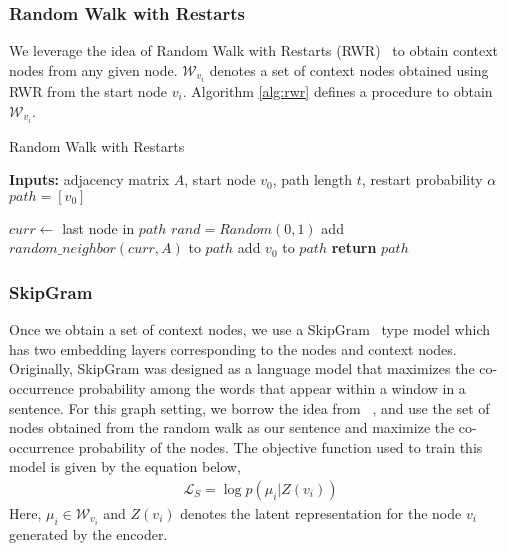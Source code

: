 \documentclass{article}
\begin{document}
\subsubsection{Random Walk with Restarts}
We leverage the idea of Random Walk with Restarts (RWR)~\cite{rwr} to obtain context nodes from any given node. $\mathcal{W}_{v_i}$ denotes a set of context nodes obtained using RWR from the start node $v_i$. Algorithm \ref{alg:rwr} defines a procedure to obtain $\mathcal{W}_{v_i}$. 

\begin{algorithm}
\caption{Random Walk with Restarts}
\label{alg:rwr}
\begin{algorithmic}
\State \textbf{Inputs: }{adjacency matrix $A$, start node $v_0$, path length $t$, restart probability $\alpha$}\\
\State $ path = [v_0] $ 

\State $curr \gets$ last node in $path$
\State $ rand = Random(0, 1) $ 
    \State add $random\_neighbor(curr, A)$ to $path$
  \Else
    \State add $v_0$ to $path$ 
\EndIf
\EndWhile
\State \textbf{return} $path$
\EndProcedure
\end{algorithmic}
\end{algorithm}


\subsubsection{SkipGram}
Once we obtain a set of context nodes, we use a SkipGram~\cite{mikolov2013efficient} type model which has two embedding layers corresponding to the nodes and context nodes. Originally, SkipGram was designed as a language model that maximizes the co-occurrence probability among the words that appear within a window in a sentence. For this graph setting, we borrow the idea from ~\cite{perozzi2014deepwalk}, and use the set of nodes obtained from the random walk as our sentence and maximize the co-occurrence probability of the nodes. The objective function used to train this model is given by the equation below,
\begin{align} \label{sg}
    \mathcal{L}_S = \log p(\mu_i | Z(v_i))
\end{align}
Here, $\mu_i \in \mathcal{W}_{v_i}$ and $Z(v_i)$ denotes the latent representation for the node $v_i$ generated by the encoder.
\end{document}

